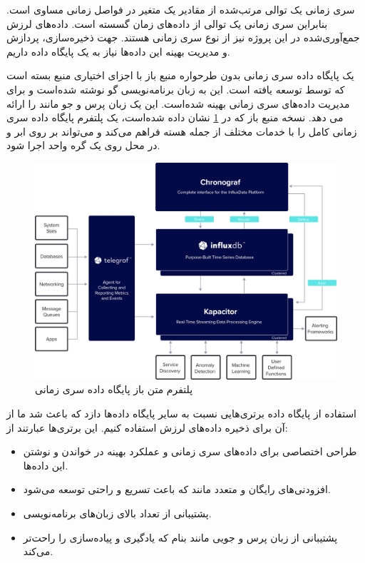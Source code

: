 سری زمانی یک توالی مرتب‌شده از مقادیر یک متغیر در فواصل زمانی مساوی است. بنابراین سری زمانی یک توالی از داده‌های زمان گسسته است\cite{naqvi2017time}. داده‌های لرزش جمع‌آوری‌شده در این پروژه نیز از نوع سری زمانی هستند. جهت ذخیره‌سازی، پردازش و مدیریت بهینه این داده‌ها نیاز به یک پایگاه داده داریم.


 یک پایگاه داده سری زمانی بدون طرحواره منبع باز با اجزای اختیاری منبع بسته است که توسط  توسعه یافته است. این به زبان برنامه‌نویسی گو نوشته شده‌است و برای مدیریت داده‌های سری زمانی بهینه شده‌است. این یک زبان پرس و جو مانند  را ارائه می دهد. نسخه منبع باز که در \cref{fig:influx} \cite{influx} نشان داده شده‌است، یک پلتفرم پایگاه داده سری زمانی کامل را با خدمات مختلف از جمله هسته  فراهم می‌کند و می‌تواند بر روی ابر و در محل روی یک گره واحد اجرا شود.

\begin{figure}[!h]
\centering\includegraphics[scale=.11]{influx.png}
\caption{پلتفرم متن باز پایگاه داده سری زمانی  \cite{influx}}\label{fig:influx}
\end{figure}

استفاده از پایگاه داده  برتری‌هایی نسبت به سایر پایگاه داده‌ها دازد که باعث شد ما از آن برای ذخیره داده‌های لرزش استفاده کنیم. این برتری‌ها عبارتند از:

\begin{itemize}
\item طراحی اختصاصی برای داده‌های سری زمانی و عملکرد بهینه در خواندن و نوشتن این داده‌ها.
\item افزودنی‌های رایگان و متعدد مانند  که باعث تسریع و راحتی توسعه می‌شود.
\item پشتیبانی از تعداد بالای زبان‌های برنامه‌نویسی.
\item پشتیبانی از زبان پرس و جویی مانند  بنام  که یادگیری و پیاده‌سازی را راحت‌تر می‌کند.
\end{itemize}

